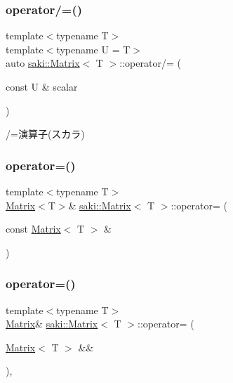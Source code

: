 \subsubsection{\texorpdfstring{operator/=()}{operator/=()}}
{\footnotesize\ttfamily template$<$typename T$>$ \\
template$<$typename U  = T$>$ \\
auto \mbox{\hyperlink{classsaki_1_1_matrix}{saki\+::\+Matrix}}$<$ T $>$\+::operator/= (\begin{DoxyParamCaption}\item[{const U \&}]{scalar }\end{DoxyParamCaption})\hspace{0.3cm}{\ttfamily [inline]}}



/=演算子(スカラ) 

\mbox{\label{classsaki_1_1_matrix_af83ebe0a4f4652fbf30dd64307021603}} 
\subsubsection{\texorpdfstring{operator=()}{operator=()}\hspace{0.1cm}{\footnotesize\ttfamily [1/2]}}
{\footnotesize\ttfamily template$<$typename T$>$ \\
\mbox{\hyperlink{classsaki_1_1_matrix}{Matrix}}$<$T$>$\& \mbox{\hyperlink{classsaki_1_1_matrix}{saki\+::\+Matrix}}$<$ T $>$\+::operator= (\begin{DoxyParamCaption}\item[{const \mbox{\hyperlink{classsaki_1_1_matrix}{Matrix}}$<$ T $>$ \&}]{ }\end{DoxyParamCaption})\hspace{0.3cm}{\ttfamily [default]}}

\mbox{\label{classsaki_1_1_matrix_a96b3519d691108a606d4ece3a9bac134}} 
\subsubsection{\texorpdfstring{operator=()}{operator=()}\hspace{0.1cm}{\footnotesize\ttfamily [2/2]}}
{\footnotesize\ttfamily template$<$typename T$>$ \\
\mbox{\hyperlink{classsaki_1_1_matrix}{Matrix}}\& \mbox{\hyperlink{classsaki_1_1_matrix}{saki\+::\+Matrix}}$<$ T $>$\+::operator= (\begin{DoxyParamCaption}\item[{\mbox{\hyperlink{classsaki_1_1_matrix}{Matrix}}$<$ T $>$ \&\&}]{ }\end{DoxyParamCaption})\hspace{0.3cm}{\ttfamily [default]}, {\ttfamily [noexcept]}}


